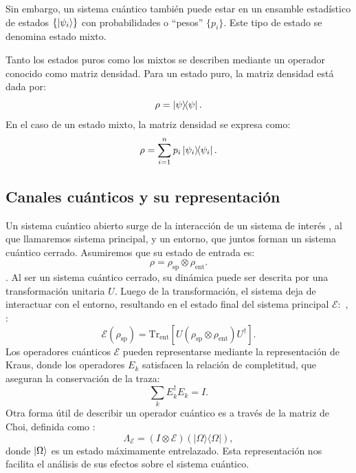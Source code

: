 \documentclass[11pt, spanish, letterpage]{article} %
\begin{document}
Sin embargo, un sistema cuántico también puede estar en un ensamble estadístico
de estados $\{\ket{\psi_i}\}$ con probabilidades o ``pesos'' $\{p_i\}$. Este tipo
de estado se denomina estado mixto.  

Tanto los estados puros como los mixtos se describen mediante un operador
conocido como matriz densidad. Para un estado puro, la matriz densidad está
dada por:
\begin{equation}
    \label{ec:1.5}
    \rho = \ketbra{\psi}.
\end{equation}
En el caso de un estado mixto, la matriz densidad se expresa como:
\begin{equation}
\label{dens_mixtos}
    \rho = \sum_{i=1}^{n} p_i \ketbra{\psi_i}.
\end{equation}




\subsection{Canales cuánticos y su representación}
Un sistema cuántico abierto surge de la interacción de un sistema de interés , al que llamaremos sistema principal, y un entorno, que juntos forman un sistema cuántico cerrado. Asumiremos que su estado de entrada es\cite{nielsen_chuang_2011}:
\begin{equation}
    \rho = \rho_{\text{sp}} \otimes \rho_{\text{ent}}.
\end{equation}  . 
Al ser un sistema cuántico cerrado, su dinámica puede ser descrita por una transformación unitaria $U$. Luego de la transformación, el sistema deja de interactuar con el entorno, resultando en el estado final del sistema principal $\mathcal{E}:$  , :
\begin{equation}
    \mathcal{E}(\rho_{\text{sp}}) = \text{Tr}_{\text{ent}}[ U( \rho_{\text{sp}} \otimes \rho_{\text{ent}} ) U^\dagger ].
\end{equation}
Los operadores cuánticos $\mathcal{E}$ pueden representarse mediante la representación de Kraus, donde los operadores ${E_k}$ satisfacen la relación de completitud, que aseguran la conservación de la traza:
\begin{equation}
\sum_k E_k^\dagger E_k = I.
\end{equation} 
Otra forma útil de describir un operador cuántico es a través de la matriz de Choi, definida como \cite{Choi2024}:
\begin{equation}
\Lambda_{\mathcal{E}} = (I \otimes \mathcal{E})(|\Omega\rangle\langle\Omega|),
\end{equation}
donde $\ket{\Omega}$ es un estado máximamente entrelazado. Esta representación nos facilita el análisis de sus efectos sobre el sistema cuántico. 
\end{document}
